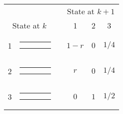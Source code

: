 { \small \renewcommand{\arraystretch}{1.1}
\begin{center}
\begin{tabular}{cccccc} \hline
 & & &\multicolumn{3}{c}{State at $k+1$} \\
\cline{4-6}
\multicolumn{2}{c}{State at $k$} & 
& 1& 2& 3\\ \hline 
1 &
{\renewcommand{\arraystretch}{0.3}
\renewcommand{\tabcolsep}{0.5mm}
\parbox[b][3mm][c]{12mm}{
\begin{tabular}{|p{2mm}|p{2mm}||p{2mm}|p{2mm}|} \hline
$\bullet$ &           &           &           \\
$\bullet$ &           &           &           \\ \hline
\end{tabular}}}
&
& $1-r$
& $0$
& $1/4$
\\
2 &
{\renewcommand{\arraystretch}{0.3}
\renewcommand{\tabcolsep}{0.5mm}
\parbox[b][3mm][c]{12mm}{
\begin{tabular}{|p{2mm}|p{2mm}||p{2mm}|p{2mm}|} \hline
$\bullet$ &           &           &           \\
          & $\bullet$ &           &           \\ \hline
\end{tabular}}}
&
& $r$
& $0$
& $1/4$
\\
3 &
{\renewcommand{\arraystretch}{0.3}
\renewcommand{\tabcolsep}{0.5mm}
\parbox[b][3mm][c]{12mm}{
\begin{tabular}{|p{2mm}|p{2mm}||p{2mm}|p{2mm}|} \hline
$\bullet$ &           &           &           \\
          &           & $\bullet$ &           \\ \hline
\end{tabular}}}
&
& $0$
& $1$
& $1/2$
\\
\hline
\end{tabular}
\end{center} }
